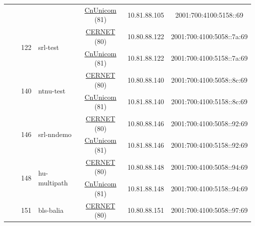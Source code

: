 \begin{small}
\begin{center}
\begin{longtable}{|c|c|c|c|c|c|c|c|}
  &  & \multicolumn{2}{|c|}{} & \multicolumn{2}{|c|}{\tiny{\href{http://www.chinaunicom.com}{CnUnicom} (81)}} & \tiny{10.81.88.105} & \tiny{2001:700:4100:5158::69} \\* \cline{3-3}\cline{4-4}\cline{5-5}\cline{6-6}\cline{7-7}\cline{8-8}
  &  & \multirow{2}{*}{\tiny{122}} & \multicolumn{1}{|l|}{\multirow{2}{*}{\tiny{srl-test}}} & \multicolumn{2}{|c|}{\tiny{\href{http://www.cernet.edu.cn}{CERNET} (80)}} & \tiny{10.80.88.122} & \tiny{2001:700:4100:5058::7a:69} \\* \cline{5-5}\cline{6-6}\cline{7-7}\cline{8-8}
  &  &  &  & \multicolumn{2}{|c|}{\tiny{\href{http://www.chinaunicom.com}{CnUnicom} (81)}} & \tiny{10.81.88.122} & \tiny{2001:700:4100:5158::7a:69} \\* \cline{3-3}\cline{4-4}\cline{5-5}\cline{6-6}\cline{7-7}\cline{8-8}
  &  & \multirow{2}{*}{\tiny{140}} & \multicolumn{1}{|l|}{\multirow{2}{*}{\tiny{ntnu-test}}} & \multicolumn{2}{|c|}{\tiny{\href{http://www.cernet.edu.cn}{CERNET} (80)}} & \tiny{10.80.88.140} & \tiny{2001:700:4100:5058::8c:69} \\* \cline{5-5}\cline{6-6}\cline{7-7}\cline{8-8}
  &  &  &  & \multicolumn{2}{|c|}{\tiny{\href{http://www.chinaunicom.com}{CnUnicom} (81)}} & \tiny{10.81.88.140} & \tiny{2001:700:4100:5158::8c:69} \\* \cline{3-3}\cline{4-4}\cline{5-5}\cline{6-6}\cline{7-7}\cline{8-8}
  &  & \multirow{2}{*}{\tiny{146}} & \multicolumn{1}{|l|}{\multirow{2}{*}{\tiny{srl-nndemo}}} & \multicolumn{2}{|c|}{\tiny{\href{http://www.cernet.edu.cn}{CERNET} (80)}} & \tiny{10.80.88.146} & \tiny{2001:700:4100:5058::92:69} \\* \cline{5-5}\cline{6-6}\cline{7-7}\cline{8-8}
  &  &  &  & \multicolumn{2}{|c|}{\tiny{\href{http://www.chinaunicom.com}{CnUnicom} (81)}} & \tiny{10.81.88.146} & \tiny{2001:700:4100:5158::92:69} \\* \cline{3-3}\cline{4-4}\cline{5-5}\cline{6-6}\cline{7-7}\cline{8-8}
  &  & \multirow{2}{*}{\tiny{148}} & \multicolumn{1}{|l|}{\multirow{2}{*}{\tiny{hu-multipath}}} & \multicolumn{2}{|c|}{\tiny{\href{http://www.cernet.edu.cn}{CERNET} (80)}} & \tiny{10.80.88.148} & \tiny{2001:700:4100:5058::94:69} \\* \cline{5-5}\cline{6-6}\cline{7-7}\cline{8-8}
  &  &  &  & \multicolumn{2}{|c|}{\tiny{\href{http://www.chinaunicom.com}{CnUnicom} (81)}} & \tiny{10.81.88.148} & \tiny{2001:700:4100:5158::94:69} \\* \cline{3-3}\cline{4-4}\cline{5-5}\cline{6-6}\cline{7-7}\cline{8-8}
  &  & \multirow{2}{*}{\tiny{151}} & \multicolumn{1}{|l|}{\multirow{2}{*}{\tiny{bls-balia}}} & \multicolumn{2}{|c|}{\tiny{\href{http://www.cernet.edu.cn}{CERNET} (80)}} & \tiny{10.80.88.151} & \tiny{2001:700:4100:5058::97:69} \\* \cline{5-5}\cline{6-6}\cline{7-7}\cline{8-8}

\end{longtable}
\end{center}
\end{small}

